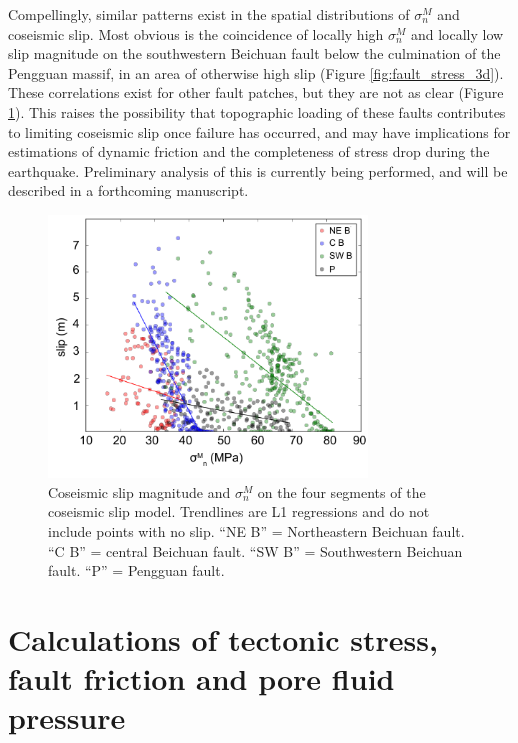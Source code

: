 \documentclass[twocolumn,jgrga]{AGUTeX}
\begin{document}
\begin{article}
Compellingly, similar patterns exist in the spatial distributions of
$\sigma^M_n$ and coseismic slip. Most obvious is the coincidence of
locally high $\sigma^M_n$ and locally low slip magnitude on the
southwestern Beichuan fault below the culmination of the Pengguan
massif, in an area of otherwise high slip (Figure
\ref{fig:fault_stress_3d}). These correlations exist for other fault
patches, but they are not as clear (Figure
\ref{fig:feng_slip_sig_n_scatter}). This raises the possibility that
topographic loading of these faults contributes to limiting coseismic
slip once failure has occurred, and
may have implications for estimations of dynamic friction and the
completeness of stress drop during the earthquake. Preliminary analysis
of this is currently being performed, and will be described in a
forthcoming manuscript.

\begin{figure}%
\centering
\includegraphics[width=20pc]{../figures/feng_slip_sig_n_scatter.pdf}
\caption{Coseismic slip magnitude and $\sigma^M_n$ on the four segments
of the \citet{feng2010} coseismic slip model. Trendlines are
L1 regressions and do not include points with no slip. ``NE B'' =
Northeastern Beichuan fault. ``C B'' = central Beichuan fault. ``SW B'' =
Southwestern Beichuan fault. ``P'' = Pengguan fault.}
\label{fig:feng_slip_sig_n_scatter}
\end{figure}

\section{Calculations of tectonic stress, fault friction and pore fluid
pressure}\label{calculations-of-tectonic-stress-fault-friction-and-pore-fluid-pressure}


\end{article}
\end{document}
